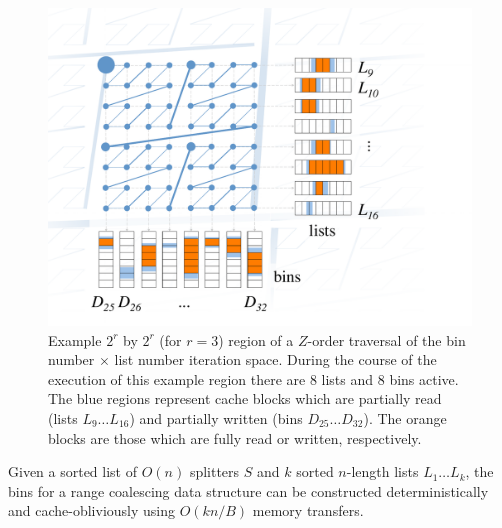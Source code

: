 \begin{figure}[h]
\includegraphics[scale=.35]{bin-construction.pdf}
\caption{Example $2^r$ by $2^r$ (for $r=3$) region of a $Z$-order traversal of 
the bin number $\times$ list number iteration space.  During the course of the
execution of this example region there are $8$ lists and $8$ 
bins active.  The blue regions represent cache blocks which
are partially read (lists $L_9 \ldots L_{16}$) and partially written 
(bins $D_{25} \ldots D_{32}$).  The orange blocks are those which are fully read or 
written, respectively.}
\label{fig:range_coalescing} 
\end{figure}


\begin{theorem}
Given a sorted list of $O(n)$ splitters $S$ and $k$ sorted $n$-length lists 
$L_1 \ldots L_k$, the bins for a range coalescing data structure can be constructed
deterministically and cache-obliviously using $O(kn/B)$ memory transfers.
\end{theorem}

